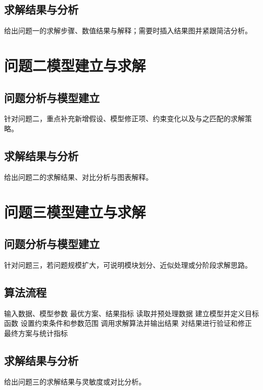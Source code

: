 \documentclass[bwprint]{gmcmthesis}
\begin{document}
\subsection{求解结果与分析}
给出问题一的求解步骤、数值结果与解释；需要时插入结果图并紧跟简洁分析。

\section{问题二模型建立与求解}

\subsection{问题分析与模型建立}
针对问题二，重点补充新增假设、模型修正项、约束变化以及与之匹配的求解策略。

\subsection{求解结果与分析}
给出问题二的求解结果、对比分析与图表解释。

\section{问题三模型建立与求解}

\subsection{问题分析与模型建立}
针对问题三，若问题规模扩大，可说明模块划分、近似处理或分阶段求解思路。

\subsection{算法流程}

\begin{algorithm}[H]
\caption{通用求解流程}
\begin{algorithmic}[1]
\Require 输入数据、模型参数
\Ensure 最优方案、结果指标
\State 读取并预处理数据
\State 建立模型并定义目标函数
\State 设置约束条件和参数范围
\State 调用求解算法并输出结果
\State 对结果进行验证和修正
\State \Return 最终方案与统计指标
\end{algorithmic}
\end{algorithm}

\subsection{求解结果与分析}
给出问题三的求解结果与灵敏度或对比分析。
\end{document}
